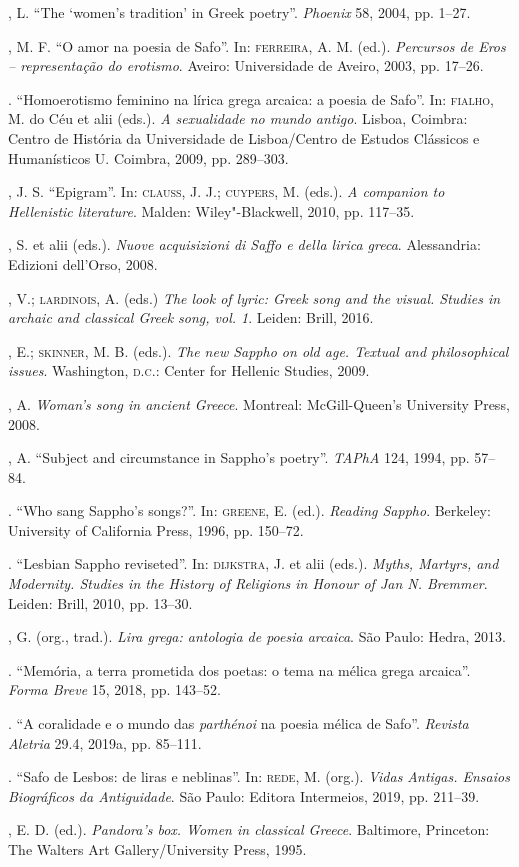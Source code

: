 \begin{bibliohedra}
, L. “The ‘women’s tradition’ in Greek poetry”. \textit{Phoenix} 58, 2004, pp. 1--27.

, M. F. “O amor na poesia de Safo”. In: \textsc{ferreira}, A. M. (ed.). \textit{Percursos de Eros -- representação do erotismo}. Aveiro: Universidade de Aveiro, 2003, pp. 17--26.

\titidem. “Homoerotismo feminino na lírica grega arcaica: a poesia de Safo”. In: \textsc{fialho}, M. do Céu et alii (eds.). \textit{A sexualidade no mundo antigo}. Lisboa, Coimbra: Centro de História da Universidade de Lisboa/Centro de Estudos Clássicos e Humanísticos U. Coimbra, 2009, pp. 289--303. 

, J. S. “Epigram”. In: \textsc{clauss}, J. J.; \textsc{cuypers}, M. (eds.). \textit{A companion to Hellenistic literature}. Malden: Wiley"-Blackwell, 2010, pp. 117--35. 

, S. et alii (eds.). \textit{Nuove acquisizioni di Saffo e della lirica greca}. Alessandria: Edizioni dell'Orso, 2008.

, V.; \textsc{lardinois}, A. (eds.) \textit{The look of lyric: Greek song and the visual. Studies in archaic and classical Greek song, vol. 1}. Leiden: Brill, 2016.

, E.; \textsc{skinner}, M. B. (eds.). \textit{The new Sappho on old age. Textual and philosophical issues}. Washington, \textsc{d.c.}: Center for Hellenic Studies, 2009.

, A. \textit{Woman’s song in ancient Greece}. Montreal: McGill-Queen’s University Press, 2008. 

, A. “Subject and circumstance in Sappho’s poetry”. \textit{TAPhA} 124, 1994, pp. 57--84.

\titidem. “Who sang Sappho’s songs?”. In: \textsc{greene}, E. (ed.). \textit{Reading Sappho}. Berkeley: University of California Press, 1996, pp. 150--72.

\titidem. ``Lesbian Sappho reviseted''. In: \textsc{dijkstra}, J. et alii (eds.). \textit{Myths, Martyrs, and Modernity. Studies in the History of Religions in Honour of Jan N. Bremmer}. Leiden: Brill, 2010, pp. 13--30.

, G. (org., trad.). \textit{Lira grega: antologia de poesia arcaica}. São Paulo: Hedra, 2013.

\titidem. “Memória, a terra prometida dos poetas: o tema na mélica grega arcaica”. \textit{Forma Breve} 15, 2018, pp. 143--52. 

\titidem. “A coralidade e o mundo das \textit{parthénoi} na poesia mélica de Safo”. \textit{Revista Aletria} 29.4, 2019a, pp. 85--111. 

\titidem. “Safo de Lesbos: de liras e neblinas”. In: \textsc{rede}, M. (org.). \textit{Vidas Antigas. Ensaios Biográficos da Antiguidade}. São Paulo: Editora Intermeios, 2019, pp. 211--39.

, E. D. (ed.). \textit{Pandora’s box. Women in classical Greece}. Baltimore, Princeton: The Walters Art Gallery/University Press, 1995.

\end{bibliohedra}

